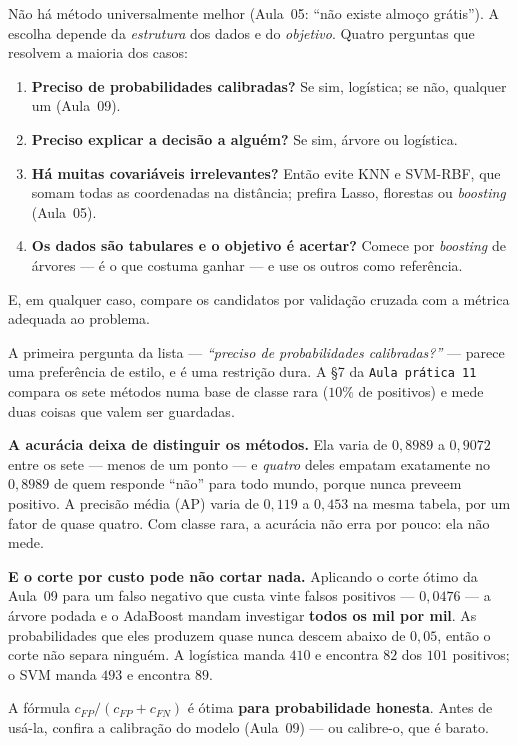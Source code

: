 \documentclass[11pt,a4paper]{article}
\begin{document}
\begin{ideia}
Não há método universalmente melhor (Aula~05: ``não existe almoço grátis''). A
escolha depende da \emph{estrutura} dos dados e do \emph{objetivo}. Quatro perguntas
que resolvem a maioria dos casos:
\begin{enumerate}[leftmargin=1.6cm,nosep]
  \item \textbf{Preciso de probabilidades calibradas?} Se sim, logística; se não,
        qualquer um (Aula~09).
  \item \textbf{Preciso explicar a decisão a alguém?} Se sim, árvore ou logística.
  \item \textbf{Há muitas covariáveis irrelevantes?} Então evite KNN e SVM-RBF, que
        somam todas as coordenadas na distância; prefira Lasso, florestas ou
        \emph{boosting} (Aula~05).
  \item \textbf{Os dados são tabulares e o objetivo é acertar?} Comece por
        \emph{boosting} de árvores --- é o que costuma ganhar --- e use os outros como
        referência.
\end{enumerate}
E, em qualquer caso, compare os candidatos por validação cruzada com a métrica
adequada ao problema.
\end{ideia}

\begin{atencao}
A primeira pergunta da lista --- \emph{``preciso de probabilidades calibradas?''} ---
parece uma preferência de estilo, e é uma restrição dura. A §7 da \texttt{Aula
prática 11} compara os sete métodos numa base de classe rara ($10\%$ de positivos) e
mede duas coisas que valem ser guardadas.

\textbf{A acurácia deixa de distinguir os métodos.} Ela varia de $0{,}8989$ a
$0{,}9072$ entre os sete --- menos de um ponto --- e \emph{quatro} deles empatam
exatamente no $0{,}8989$ de quem responde ``não'' para todo mundo, porque nunca
preveem positivo. A precisão média (AP) varia de $0{,}119$ a $0{,}453$ na mesma
tabela, por um fator de quase quatro. Com classe rara, a acurácia não erra por
pouco: ela não mede.

\textbf{E o corte por custo pode não cortar nada.} Aplicando o corte ótimo da
Aula~09 para um falso negativo que custa vinte falsos positivos --- $0{,}0476$ ---
a árvore podada e o AdaBoost mandam investigar \textbf{todos os mil por mil}. As
probabilidades que eles produzem quase nunca descem abaixo de $0{,}05$, então o
corte não separa ninguém. A logística manda $410$ e encontra $82$ dos $101$
positivos; o SVM manda $493$ e encontra $89$.

A fórmula $c_{FP}/(c_{FP}+c_{FN})$ é ótima \textbf{para probabilidade honesta}. Antes
de usá-la, confira a calibração do modelo (Aula~09) --- ou calibre-o, que é barato.
\end{atencao}
\end{document}
